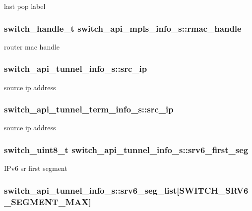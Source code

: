 last pop label \hypertarget{group__Tunnel_gae87675e11f4c9787d9937f500bfbc914}{
\subsubsection[{rmac\+\_\+handle}]{\setlength{\rightskip}{0pt plus 5cm}switch\+\_\+handle\+\_\+t switch\+\_\+api\+\_\+mpls\+\_\+info\+\_\+s\+::rmac\+\_\+handle}}\label{group__Tunnel_gae87675e11f4c9787d9937f500bfbc914}
router mac handle \hypertarget{group__Tunnel_ga9be28d9bd055ac1af0f30d36dce3113e}{
\subsubsection[{src\+\_\+ip}]{ switch\+\_\+api\+\_\+tunnel\+\_\+info\+\_\+s\+::src\+\_\+ip}}\label{group__Tunnel_ga9be28d9bd055ac1af0f30d36dce3113e}
source ip address \hypertarget{group__Tunnel_gae3eaebd60a50c2437066dace61929bd5}{
\subsubsection[{src\+\_\+ip}]{ switch\+\_\+api\+\_\+tunnel\+\_\+term\+\_\+info\+\_\+s\+::src\+\_\+ip}}\label{group__Tunnel_gae3eaebd60a50c2437066dace61929bd5}
source ip address \hypertarget{group__Tunnel_gaf87c6fecf6dff3564910928b7e8eea7a}{
\subsubsection[{srv6\+\_\+first\+\_\+seg}]{\setlength{\rightskip}{0pt plus 5cm}switch\+\_\+uint8\+\_\+t switch\+\_\+api\+\_\+tunnel\+\_\+info\+\_\+s\+::srv6\+\_\+first\+\_\+seg}}\label{group__Tunnel_gaf87c6fecf6dff3564910928b7e8eea7a}
I\+Pv6 sr first segment \hypertarget{group__Tunnel_ga14d1a11fe2372fe426867817ab8ddabc}{
\subsubsection[{srv6\+\_\+seg\+\_\+list}]{ switch\+\_\+api\+\_\+tunnel\+\_\+info\+\_\+s\+::srv6\+\_\+seg\+\_\+list\mbox{[}{\bf S\+W\+I\+T\+C\+H\+\_\+\+S\+R\+V6\+\_\+\+S\+E\+G\+M\+E\+N\+T\+\_\+\+M\+A\+X}\mbox{]}}}\label{group__Tunnel_ga14d1a11fe2372fe426867817ab8ddabc}
